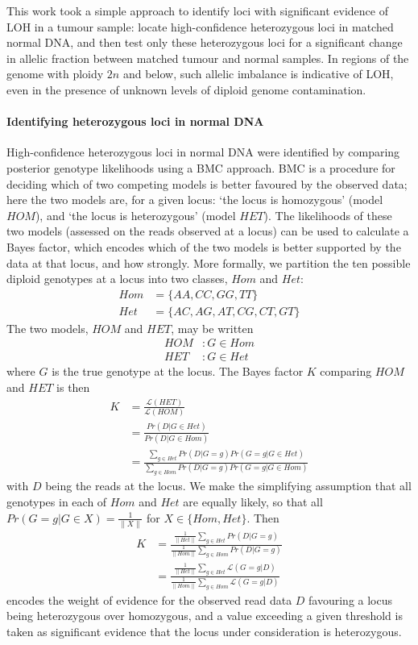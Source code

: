 \documentclass[thesis.tex]{subfiles}
\begin{document}
This work took a simple approach to identify loci with significant evidence of \gls{LOH} in a tumour sample: locate high-confidence heterozygous loci in matched normal DNA, and then test only these heterozygous loci for a significant change in allelic fraction between matched tumour and normal samples.  In regions of the genome with ploidy $2n$ and below, such allelic imbalance is indicative of \gls{LOH}, even in the presence of unknown levels of diploid genome contamination.

\paragraph{Identifying heterozygous loci in normal DNA}

High-confidence heterozygous loci in normal DNA were identified by comparing posterior genotype likelihoods using a \gls{BMC} approach.  \gls{BMC} is a procedure for deciding which of two competing models is better favoured by the observed data; here the two models are, for a given locus: `the locus is homozygous' (model $HOM$), and `the locus is heterozygous' (model $HET$).  The likelihoods of these two models (assessed on the reads observed at a locus) can be used to calculate a Bayes factor, which encodes which of the two models is better supported by the data at that locus, and how strongly.  More formally, we partition the ten possible diploid genotypes at a locus into two classes, $Hom$ and $Het$:
\begin{align}
Hom &= \{AA, CC, GG, TT\} \\
Het &= \{AC, AG, AT, CG, CT, GT\}
\end{align}
The two models, $HOM$ and $HET$, may be written
\begin{align}
HOM &: G \in Hom \\
HET &: G \in Het
\end{align}
where $G$ is the true genotype at the locus.  The Bayes factor $K$ comparing $HOM$ and $HET$ is then
\begin{align}
K &= \frac{\mathcal{L}(HET)}{\mathcal{L}(HOM)} \\
  &= \frac{Pr(D|G \in Het)}{Pr(D|G \in Hom)} \\
  &= \frac{\sum_{g \in Het} Pr(D|G = g)Pr(G = g|G \in Het) }{\sum_{g \in Hom} Pr(D|G = g)Pr(G = g|G \in Hom) }
\label{eq:comm_het_bayes}
\end{align}
with $D$ being the reads at the locus.  We make the simplifying assumption that all genotypes in each of $Hom$ and $Het$ are equally likely, so that all $Pr(G = g|G \in X) = \frac{1}{\|X\|}$ for $X \in \{Hom, Het\}$.  Then
\begin{align}
K &= \frac{\frac{1}{\|Het\|}\sum_{g \in Het} Pr(D|G = g)}{\frac{1}{\|Hom\|}\sum_{g \in Hom} Pr(D|G = g)} \\
  &= \frac{\frac{1}{\|Het\|}\sum_{g \in Het} \mathcal{L}(G = g|D)}{\frac{1}{\|Hom\|}\sum_{g \in Hom} \mathcal{L}(G = g|D)}
\end{align} 
encodes the weight of evidence for the observed read data $D$ favouring a locus being heterozygous over homozygous, and a value exceeding a given threshold is taken as significant evidence that the locus under consideration is heterozygous.
\end{document}
